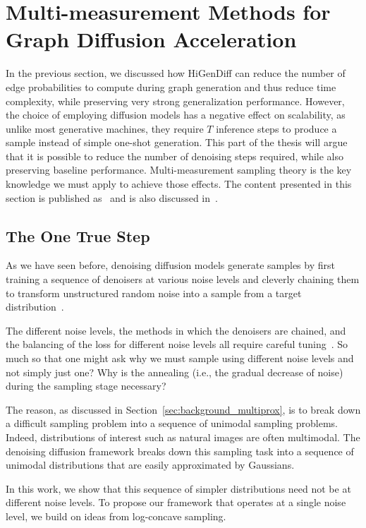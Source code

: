 \section{Multi-measurement Methods for Graph Diffusion Acceleration}
\label{sec: multiprox}

In the previous section, we discussed how HiGenDiff can reduce the number of edge probabilities to compute during graph generation and thus reduce time complexity, while preserving very strong generalization performance. However, the choice of employing diffusion models has a negative effect on scalability, as unlike most generative machines, they require $T$ inference steps to produce a sample instead of simple one-shot generation. This part of the thesis will argue that it is possible to reduce the number of denoising steps required, while also preserving baseline performance. Multi-measurement sampling theory is the key knowledge we must apply to achieve those effects. The content presented in this section is published as~\cite{dadi_improving_2025} and is also discussed in~\cite{dadi_noisy_2025}.

\subsection{The One True Step}

As we have seen before, denoising diffusion models generate samples by first training a sequence of denoisers at various noise levels and cleverly chaining them to transform unstructured random noise into a sample from a target distribution~\cite{ho_denoising_2020, dhariwal_diffusion_2021}. 

The different noise levels, the methods in which the denoisers are chained, and the balancing of the loss for different noise levels all require careful tuning~\cite{karras_elucidating_2022}. So much so that one might ask why we must sample using different noise levels and not simply just one? Why is the annealing (i.e., the gradual decrease of noise) during the sampling stage necessary? 

The reason, as discussed in Section~\ref{sec:background_multiprox}, is to break down a difficult sampling problem into a sequence of unimodal sampling problems. Indeed, distributions of interest such as natural images are often multimodal. The denoising diffusion framework breaks down this sampling task into a sequence of unimodal distributions that are easily approximated by Gaussians. 

In this work, we show that this sequence of simpler distributions need not be at different noise levels. To propose our framework that operates at a single noise level, we build on ideas from log-concave sampling.

